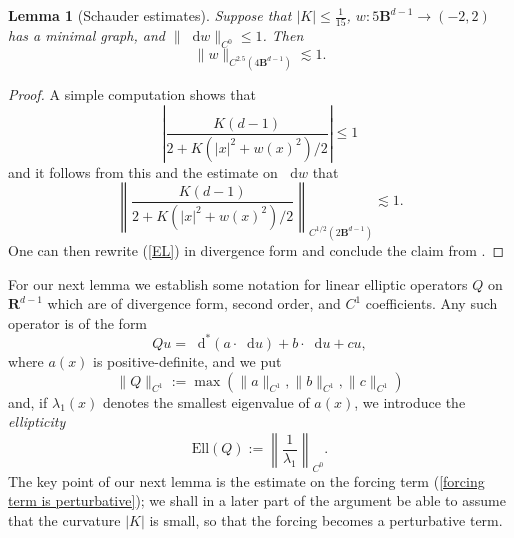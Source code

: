 \documentclass[reqno,11pt]{amsart}
\newcommand{\RR}{\mathbf{R}}
\newcommand{\Ball}{\mathbf{B}}
\newcommand*\dif{\mathop{}\!\mathrm{d}}
\newcommand{\Ell}{\mathrm{Ell}}
\newcommand{\dfn}[1]{\emph{#1}\index{#1}}
\newtheorem{lemma}[theorem]{Lemma}
\theoremstyle{definition}
\numberwithin{equation}{section}
\begin{document}
\begin{lemma}[Schauder estimates]\label{Schauder}
Suppose that $|K| \leq \frac{1}{15}$, $w: 5\Ball^{d - 1} \to (-2, 2)$ has a minimal graph, and $\|\dif w\|_{C^0} \leq 1$.
Then
\begin{equation}\label{norms on uk}
	\|w\|_{C^{2.5}(4\Ball^{d - 1})} \lesssim 1.
\end{equation}
\end{lemma}
\begin{proof}
A simple computation shows that
$$\left|\frac{K(d - 1)}{2 + K(|x|^2 + w(x)^2)/2}\right| \leq 1$$
and it follows from this and the estimate on $\dif w$ that
$$\left\|\frac{K(d - 1)}{2 + K(|x|^2 + w(x)^2)/2}\right\|_{C^{1/2}(2 \Ball^{d - 1})} \lesssim 1.$$
One can then rewrite (\ref{EL}) in divergence form and conclude the claim from \cite[Theorems 6.2 and 13.1]{gilbarg2015elliptic}.
\end{proof}

For our next lemma we establish some notation for linear elliptic operators $Q$ on $\RR^{d - 1}$ which are of divergence form, second order, and $C^1$ coefficients.
Any such operator is of the form 
$$Qu = \dif^*(a \cdot \dif u) + b \cdot \dif u + cu,$$
where $a(x)$ is positive-definite, and we put
$$\|Q\|_{C^1} := \max(\|a\|_{C^1}, \|b\|_{C^1}, \|c\|_{C^1})$$
and, if $\lambda_1(x)$ denotes the smallest eigenvalue of $a(x)$, we introduce the \dfn{ellipticity}
$$\Ell(Q) := \left\|\frac{1}{\lambda_1}\right\|_{C^0}.$$
The key point of our next lemma is the estimate on the forcing term (\ref{forcing term is perturbative}); we shall in a later part of the argument be able to assume that the curvature $|K|$ is small, so that the forcing becomes a perturbative term.
\end{document}
